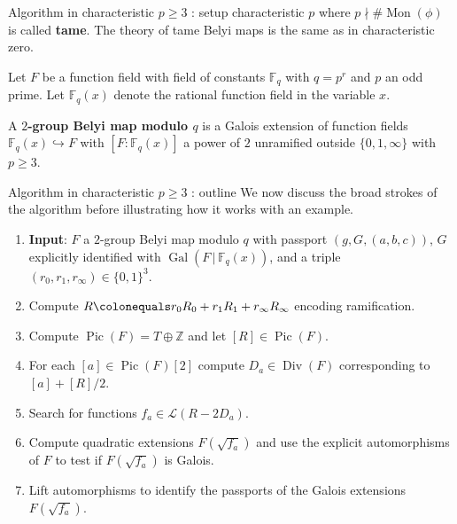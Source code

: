 \documentclass[handout,xcolor=dvipsnames]{beamer}
\theoremstyle{plain}
\newcommand{\ZZ}{\mathbb Z}
\newcommand{\FF}{\mathbb{F}}
\DeclareMathOperator{\Div}{Div}
\DeclareMathOperator{\Pic}{Pic}
\DeclareMathOperator{\Mon}{Mon}
\DeclareMathOperator{\Gal}{Gal}
\begin{document}
{\begin{frame}{Algorithm in characteristic $p\geq 3$ : setup}
      characteristic $p$ where $p\nmid\#\Mon(\phi)$
      is called \textbf{tame}.
      The theory of tame Belyi maps is the same as in
      characteristic zero.
      \pause\par
      Let $F$ be a function field with
      field of constants $\FF_q$
      with $q=p^r$ and $p$ an odd prime.
      Let $\FF_q(x)$ denote the rational function field
      in the variable $x$.
      \pause\par
      A \textbf{$2$-group Belyi map modulo $q$}
      is a Galois extension of function fields
      $\FF_q(x)\hookrightarrow F$
      with $[F:\FF_q(x)]$ a power of $2$
      unramified outside $\{0,1,\infty\}$
      with $p\geq 3$.
    \end{frame}
    \begin{frame}{Algorithm in characteristic $p\geq 3$ : outline}
      We now discuss the broad strokes of the algorithm
      before illustrating how it works with an example.
      \pause
      \begin{enumerate}
        \item
          \textbf{Input}:
          $F$ a $2$-group Belyi map modulo $q$ with
          passport $(g,G,(a,b,c))$,
          $G$ explicitly identified with
          $\Gal(F\,|\,\FF_q(x))$,
          and a triple $(r_0,r_1,r_\infty)\in\{0,1\}^3$.
          \pause
        \item
          Compute $R\colonequals r_0R_0+r_1R_1+r_\infty R_\infty$
          encoding ramification.
          \pause
        \item
          Compute $\Pic(F) = T\oplus\ZZ$
          and let $[R]\in\Pic(F)$.
          \pause
        \item
          For each $[a]\in\Pic(F)[2]$ compute
          $D_a\in\Div(F)$ corresponding to
          $[a]+[R]/2$.
          \pause
        \item
          Search for functions
          $f_a\in\mathscr{L}(R-2D_a)$.
          \pause
        \item
          Compute quadratic extensions
          $F(\sqrt{f_a})$ and use
          the explicit automorphisms of $F$
          to test if $F(\sqrt{f_a})$ is Galois.
          \pause
        \item
          Lift automorphisms to identify
          the passports of the
          Galois extensions $F(\sqrt{f_a})$.
      \end{enumerate}
    \end{frame}
}
\end{document}
